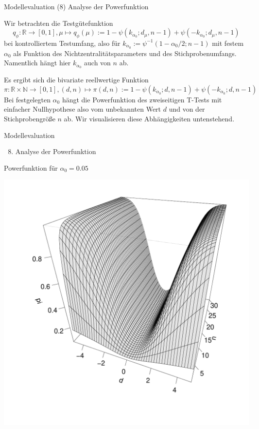 \documentclass[
  8pt,
  ignorenonframetext,
]{beamer}
\providecommand{\tightlist}{%
  \setlength{\itemsep}{0pt}\setlength{\parskip}{0pt}}
\begin{document}
\begin{frame}{Modellevaluation}
\protect\hypertarget{modellevaluation-19}{}
\noindent (8) Analyse der Powerfunktion \vfill \justifying

\small

Wir betrachten die Testgütefunktion \begin{equation}
q_\phi : \mathbb{R} \to [0,1],
\mu \mapsto q_\phi(\mu)
:= 1 - \psi(k_{\alpha_0}; d_\mu, n-1) + \psi(-k_{\alpha_0}; d_\mu, n-1)
\end{equation} bei kontrolliertem Testumfang, also für
\(k_{\alpha_0} := \psi^{-1}(1-\alpha_0/2;n-1)\) mit festem \(\alpha_0\)
als Funktion des Nichtzentralitätsparameters und des Stichprobenumfangs.
Namentlich hängt hier \(k_{\alpha_0}\) auch von \(n\) ab.

Es ergibt sich die bivariate reellwertige Funktion \begin{equation}
\pi : \mathbb{R} \times \mathbb{N} \to [0,1],
(d,n) \mapsto
\pi(d,n) := 1 - \psi(k_{\alpha_0}; d, n-1) + \psi(-k_{\alpha_0}; d, n-1)
\end{equation} Bei festgelegten \(\alpha_0\) hängt die Powerfunktion des
zweiseitigen T-Tests mit einfacher Nullhypothese also vom unbekannten
Wert \(d\) und von der Stichprobengröße \(n\) ab. Wir visualisieren
diese Abhängigkeiten untenstehend. \vfill
\end{frame}

\begin{frame}{Modellevaluation}
\protect\hypertarget{modellevaluation-20}{}
\begin{enumerate}
[(1)]
\setcounter{enumi}{7}
\tightlist
\item
  Analyse der Powerfunktion
\end{enumerate}

\small

Powerfunktion für \(\alpha_0 = 0.05\)

\begin{center}\includegraphics[width=0.6\linewidth]{9_Abbildungen/alm_9_t_test_ungerichtet_power_005} \end{center}
\end{frame}
\end{document}
